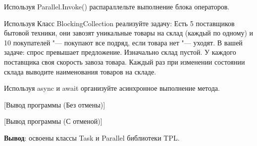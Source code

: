 \documentclass{bsuir}
\begin{document}
Используя Parallel.Invoke() распараллельте выполнение блока операторов.

Используя Класс BlockingCollection реализуйте задачу: Есть 5 поставщиков бытовой
техники, они завозят уникальные товары на склад (каждый по одному) и 10
покупателей "--- покупают все подряд, если товара нет "--- уходят. В вашей
задаче: спрос превышает предложение. Изначально склад пустой. У каждого
поставщика своя скорость завоза товара. Каждый раз при изменении состоянии
склада выводите наименования товаров на складе.

Используя async и await организуйте асинхронное выполнение метода.


[Вывод программы (Без отмены)]

[Вывод программы (С отменой)]

\textbf{Вывод}: освоены классы Task и Parallel библиотеки TPL.
\end{document}
